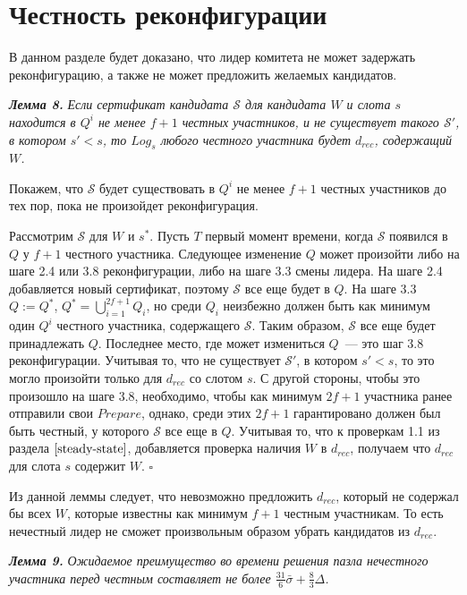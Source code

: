 \section{Честность реконфигурации}
В данном разделе будет доказано, что лидер комитета не может задержать реконфигурацию, а также не может предложить желаемых кандидатов.

\textbf{\textit{Лемма 8.}} \textit{Если сертификат кандидата $\mathcal{S}$ для кандидата $W$ и слота $s$ находится в $Q^i$ не менее $f+1$ честных участников, и не существует такого $\mathcal{S}'$, в котором $s' < s$,  то $Log_s$ любого честного участника будет $d_{rec}$, содержащий $W$.}

Покажем, что $\mathcal{S}$ будет существовать в $Q^i$ не менее $f+1$ честных участников до тех пор, пока не произойдет реконфигурация.

Рассмотрим $\mathcal{S}$ для $W$ и $s^{*}$. Пусть $T$ первый момент времени, когда $\mathcal{S}$ появился в $Q$ у $f+1$ честного участника. Следующее изменение $Q$  может произойти либо на шаге 2.4 или 3.8 реконфигурации, либо на шаге 3.3 смены лидера. На шаге 2.4 добавляется новый сертификат, поэтому $\mathcal{S}$ все еще будет в $Q$.  На шаге 3.3 $Q := Q^{*}$, $Q^{*}=\bigcup\limits_{i=1}^{2f+1} Q_i$, но среди $Q_i$ неизбежно должен быть как минимум один $Q^i$ честного участника, содержащего $\mathcal{S}$. Таким образом, $\mathcal{S}$ все еще будет принадлежать $Q$. Последнее место, где может измениться $Q$~--- это шаг 3.8 реконфигурации. Учитывая то, что не существует $\mathcal{S}'$, в котором $s' < s$, то это могло произойти только для $d_{rec}$ со слотом $s$. С другой стороны, чтобы это произошло на шаге 3.8, необходимо, чтобы как минимум $2f+1$ участника ранее отправили свои $Prepare$, однако, среди этих $2f+1$ гарантировано должен был быть честный, у которого $\mathcal{S}$ все еще в $Q$. Учитывая то, что к проверкам 1.1 из раздела $\ref{steady-state}$, добавляется проверка наличия $W$ в $d_{rec}$, получаем что $d_{rec}$ для слота $s$ содержит $W$.
$\square$
\vspace{10pt}

Из данной леммы следует, что невозможно предложить $d_{rec}$, который не содержал бы всех $W$, которые известны как минимум $f+1$ честным участникам. То есть нечестный лидер не сможет произвольным образом убрать кандидатов из $d_{rec}$.
\vspace{10pt}

\textbf{\textit{Лемма 9.}}  \textit{Ожидаемое преимущество во времени решения пазла нечестного участника перед честным составляет не более $\frac{31}{6}\bar{\sigma}+\frac{8}{3}\Delta$.}

